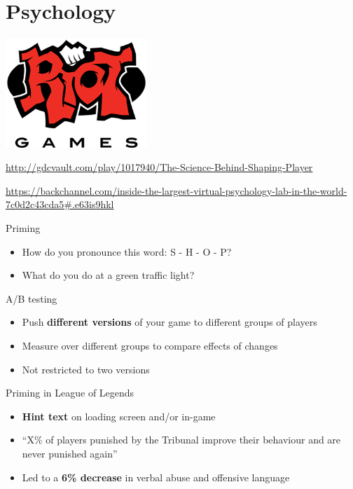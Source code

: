 \part{Psychology}
\frame{\partpage}

\begin{frame}
	\begin{center}
		\includegraphics[width=0.4\textwidth]{riot_logo}
		
		\url{http://gdcvault.com/play/1017940/The-Science-Behind-Shaping-Player}
		
		\url{https://backchannel.com/inside-the-largest-virtual-psychology-lab-in-the-world-7c0d2c43cda5\#.e63is9hkl}
	\end{center}
\end{frame}

\begin{frame}{Priming}
	\begin{itemize}
		\pause\item How do you pronounce this word: S - H - O - P?
		\pause\item What do you do at a green traffic light?
	\end{itemize}
\end{frame}

\begin{frame}{A/B testing}
	\begin{itemize}
		\pause\item Push \textbf{different versions} of your game to different groups of players
		\pause\item Measure over different groups to compare effects of changes
		\pause\item Not restricted to two versions
	\end{itemize}
\end{frame}

\begin{frame}{Priming in League of Legends}
	\begin{itemize}
		\pause\item \textbf{Hint text} on loading screen and/or in-game
		\pause\item ``X\% of players punished by the Tribunal improve their behaviour and are never punished again''
		\pause\item Led to a \textbf{6\% decrease} in verbal abuse and offensive language
	\end{itemize}
\end{frame}

